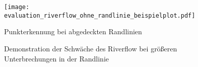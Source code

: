 \begin{figure}[htbp] %
	\centering
	\texttt{[image: evaluation\_riverflow\_ohne\_randlinie\_beispielplot.pdf]}
	\label{fig:evaluation:riverflow:ohneMittellinie:bspPlot}
	\caption{Punkterkennung bei abgedeckten Randlinien}
\end{figure}





\begin{figure}[htbp] %
	\hfill
	\label{fig:evaluation:riverflow:Randlinie:unterbrochen}
	\caption{Demonstration der Schwäche des Riverflow bei größeren Unterbrechungen in der Randlinie}
\end{figure}
